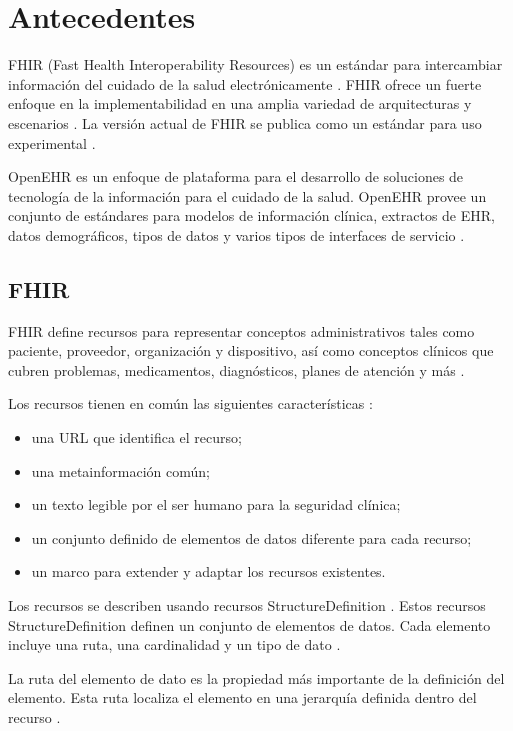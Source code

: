 \chapter{Antecedentes}

FHIR (Fast Health Interoperability Resources) es un estándar para intercambiar información del cuidado de la salud electrónicamente \cite{FHIRClinician}. FHIR ofrece un fuerte enfoque en la implementabilidad en una amplia variedad de arquitecturas y escenarios \cite{FHIRExecutive}. La versión actual de FHIR se publica como un estándar para uso experimental \cite{FHIR}.

OpenEHR es un enfoque de plataforma para el desarrollo de soluciones de tecnología de la información para el cuidado de la salud. OpenEHR provee un conjunto de estándares para modelos de información clínica, extractos de EHR, datos demográficos, tipos de datos y varios tipos de interfaces de servicio \cite{openEHRWhitePaper}.

\section{FHIR}

FHIR define recursos para representar conceptos administrativos tales como paciente, proveedor, organización y dispositivo, así como conceptos clínicos que cubren problemas, medicamentos, diagnósticos, planes de atención y más \cite{FHIRResourceList}.

Los recursos tienen en común las siguientes características \cite{FHIRDeveloper}:
\begin{itemize}
  \item una URL que identifica el recurso;
  \item una metainformación común;
  \item un texto legible por el ser humano para la seguridad clínica;
  \item un conjunto definido de elementos de datos diferente para cada recurso;
  \item un marco para extender y adaptar los recursos existentes.
\end{itemize}

Los recursos se describen usando recursos StructureDefinition \cite{FHIRStructureDefinition}. Estos recursos StructureDefinition definen un conjunto de elementos de datos. Cada elemento incluye una ruta, una cardinalidad y un tipo de dato \cite{FHIRElementDefinition}.

La ruta del elemento de dato es la propiedad más importante de la definición del elemento. Esta ruta localiza el elemento en una jerarquía definida dentro del recurso \cite{FHIRElementDefinition}.

